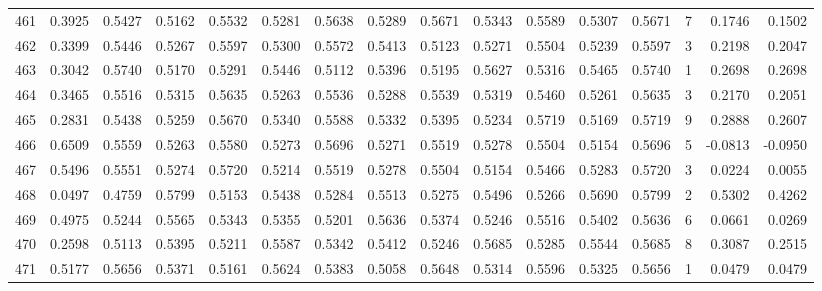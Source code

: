 \begin{tabular}{lrrrrrrrrrrrrrrr}
461 &      0.3925 &  0.5427 &  0.5162 &  0.5532 &  0.5281 &  0.5638 &  0.5289 &  0.5671 &  0.5343 &  0.5589 &   0.5307 &     0.5671 &      7 &                    0.1746 &                     0.1502 \\
462 &      0.3399 &  0.5446 &  0.5267 &  0.5597 &  0.5300 &  0.5572 &  0.5413 &  0.5123 &  0.5271 &  0.5504 &   0.5239 &     0.5597 &      3 &                    0.2198 &                     0.2047 \\
463 &      0.3042 &  0.5740 &  0.5170 &  0.5291 &  0.5446 &  0.5112 &  0.5396 &  0.5195 &  0.5627 &  0.5316 &   0.5465 &     0.5740 &      1 &                    0.2698 &                     0.2698 \\
464 &      0.3465 &  0.5516 &  0.5315 &  0.5635 &  0.5263 &  0.5536 &  0.5288 &  0.5539 &  0.5319 &  0.5460 &   0.5261 &     0.5635 &      3 &                    0.2170 &                     0.2051 \\
465 &      0.2831 &  0.5438 &  0.5259 &  0.5670 &  0.5340 &  0.5588 &  0.5332 &  0.5395 &  0.5234 &  0.5719 &   0.5169 &     0.5719 &      9 &                    0.2888 &                     0.2607 \\
466 &      0.6509 &  0.5559 &  0.5263 &  0.5580 &  0.5273 &  0.5696 &  0.5271 &  0.5519 &  0.5278 &  0.5504 &   0.5154 &     0.5696 &      5 &                   -0.0813 &                    -0.0950 \\
467 &      0.5496 &  0.5551 &  0.5274 &  0.5720 &  0.5214 &  0.5519 &  0.5278 &  0.5504 &  0.5154 &  0.5466 &   0.5283 &     0.5720 &      3 &                    0.0224 &                     0.0055 \\
468 &      0.0497 &  0.4759 &  0.5799 &  0.5153 &  0.5438 &  0.5284 &  0.5513 &  0.5275 &  0.5496 &  0.5266 &   0.5690 &     0.5799 &      2 &                    0.5302 &                     0.4262 \\
469 &      0.4975 &  0.5244 &  0.5565 &  0.5343 &  0.5355 &  0.5201 &  0.5636 &  0.5374 &  0.5246 &  0.5516 &   0.5402 &     0.5636 &      6 &                    0.0661 &                     0.0269 \\
470 &      0.2598 &  0.5113 &  0.5395 &  0.5211 &  0.5587 &  0.5342 &  0.5412 &  0.5246 &  0.5685 &  0.5285 &   0.5544 &     0.5685 &      8 &                    0.3087 &                     0.2515 \\
471 &      0.5177 &  0.5656 &  0.5371 &  0.5161 &  0.5624 &  0.5383 &  0.5058 &  0.5648 &  0.5314 &  0.5596 &   0.5325 &     0.5656 &      1 &                    0.0479 &                     0.0479 \\

\end{tabular}
